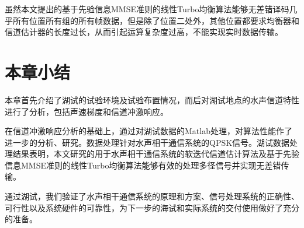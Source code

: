 虽然本文提出的基于先验信息MMSE准则的线性Turbo均衡算法能够无差错译码几乎所有位置所有组的所有帧数据，但是除了位置二处外，其他位置都要求均衡器和信道估计器的长度过长，从而引起运算复杂度过高，不能实现实时数据传输。
\section{本章小结}
本章首先介绍了湖试的试验环境及试验布置情况，而后对湖试地点的水声信道特性进行了分析，包括声速梯度和信道冲激响应。

在信道冲激响应分析的基础上，通过对湖试数据的Matlab处理，对算法性能作了进一步的分析、研究。数据处理针对水声相干通信系统的QPSK信号。湖试数据处理结果表明，本文研究的用于水声相干通信系统的软迭代信道估计算法及基于先验信息MMSE准则的线性Turbo均衡算法能够有效的处理多径信号并实现无差错传输。

通过湖试，我们验证了水声相干通信系统的原理和方案、信号处理系统的正确性、可行性以及系统硬件的可靠性，为下一步的海试和实际系统的交付使用做好了充分的准备。
%
\clearpage{\pagestyle{empty}\cleardoublepage}
